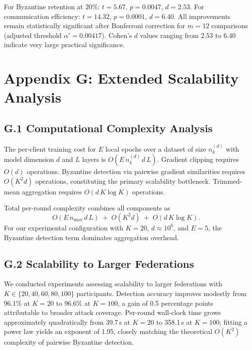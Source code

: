\documentclass[12pt,a4paper]{article}
\theoremstyle{definition}
\begin{document}
For Byzantine retention at $20\%$: $t=5.67$, $p=0.0047$, $d=2.53$. For communication efficiency: $t=14.32$, $p=0.0001$, $d=6.40$. All improvements remain statistically significant after Bonferroni correction for $m=12$ comparisons (adjusted threshold $\alpha'=0.00417$). Cohen's $d$ values ranging from $2.53$ to $6.40$ indicate very large practical significance.

\section{Appendix G: Extended Scalability Analysis}

\subsection{G.1 Computational Complexity Analysis}

\begingroup
\setlength{\emergencystretch}{2em} %
The per-client training cost for $E$ local epochs over a dataset of size $n_k^{(d)}$ with model dimension $d$ and $L$ layers is $O(E\,n_k^{(d)}\,d\,L)$. Gradient clipping requires $O(d)$ operations. Byzantine detection via pairwise gradient similarities requires $O(K^{2}d)$ operations, constituting the primary scalability bottleneck. Trimmed-mean aggregation requires $O(d\,K\log K)$ operations.

Total per-round complexity combines all components as
\[
O\!\left(E\,n_{\max}\,d\,L\right)\;+\;O\!\left(K^{2}d\right)\;+\;O\!\left(d\,K\log K\right).
\]
For our experimental configuration with \(K=20\), \(d\approx 10^{6}\), and \(E=5\), the Byzantine detection term dominates aggregation overhead.
\par\endgroup


\subsection{G.2 Scalability to Larger Federations}

We conducted experiments assessing scalability to larger federations with $K \in \{20, 40, 60, 80, 100\}$ participants. Detection accuracy improves modestly from 96.1\% at $K=20$ to 96.6\% at $K=100$, a gain of 0.5 percentage points attributable to broader attack coverage. Per-round wall-clock time grows approximately quadratically from 39.7\,s at $K=20$ to 358.1\,s at $K=100$; fitting a power law yields an exponent of 1.95, closely matching the theoretical $O(K^2)$ complexity of pairwise Byzantine detection.
\end{document}
